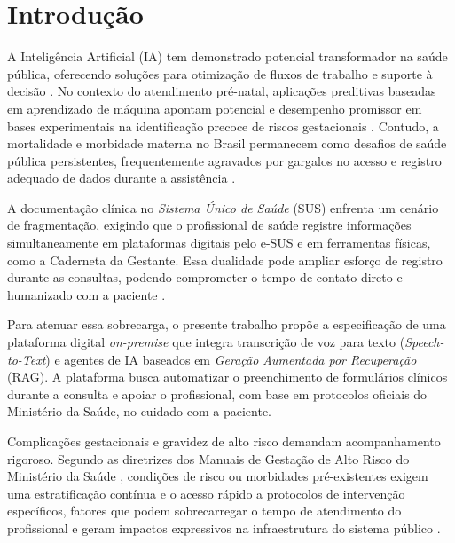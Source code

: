 \documentclass[12pt]{article}
\begin{document}
\section{Introdução}

A Inteligência Artificial (IA) tem demonstrado potencial transformador na saúde pública, oferecendo soluções para otimização de fluxos de trabalho e suporte à decisão \cite{Rajpurkar2022, Cabitza2022}.
No contexto do atendimento pré-natal, aplicações preditivas baseadas em aprendizado de máquina apontam potencial e desempenho promissor em bases experimentais na identificação precoce de riscos gestacionais \cite{HighRiskPregnancy2025, MachineLearning2022}.
Contudo, a mortalidade e morbidade materna no Brasil permanecem como desafios de saúde pública persistentes, frequentemente agravados por gargalos no acesso e registro adequado de dados durante a assistência \cite{AcessoPreNatal2018, Laurenti2010}.

A documentação clínica no \textit{Sistema Único de Saúde} (SUS) enfrenta um cenário de fragmentação, exigindo que o profissional de saúde registre informações simultaneamente em plataformas digitais pelo e-SUS e em ferramentas físicas, como a Caderneta da Gestante.
Essa dualidade pode ampliar esforço de registro durante as consultas, podendo comprometer o tempo de contato direto e humanizado com a paciente \cite{Viellas2014PreNatal, Rajpurkar2022}.

Para atenuar essa sobrecarga, o presente trabalho propõe a especificação de uma plataforma digital \textit{on-premise} que integra transcrição de voz para texto (\textit{Speech-to-Text}) e agentes de IA baseados em \textit{Geração Aumentada por Recuperação} (RAG).
A plataforma busca automatizar o preenchimento de formulários clínicos durante a consulta e apoiar o profissional, com base em protocolos oficiais do Ministério da Saúde, no cuidado com a paciente.


Complicações gestacionais e gravidez de alto risco demandam acompanhamento rigoroso.
Segundo as diretrizes dos Manuais de Gestação de Alto Risco do Ministério da Saúde \cite{ManualAltoRisco2022, ManualAltoRisco2012}, condições de risco ou morbidades pré-existentes exigem uma estratificação contínua e o acesso rápido a protocolos de intervenção específicos, fatores que podem sobrecarregar o tempo de atendimento do profissional e geram impactos expressivos na infraestrutura do sistema público \cite{MaternalMorbidity2025}.
\end{document}
